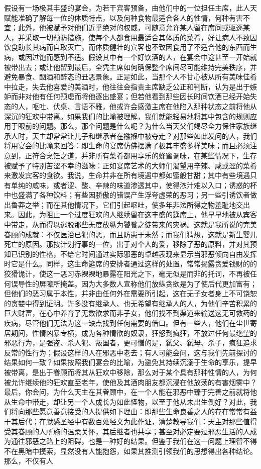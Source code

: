 假设有一场极其丰盛的宴会，为若干宾客预备，由他们中的一位担任主席，此人天赋能准确了解每一位的体质特点，以及何种食物最适合各人的性情，何种有害不宜；此外，他被赋予对他们近乎绝对的权威，可随意允许某人留在席间或驱逐某人，并采取一切预防措施，使每个人都食用最适合其体质的菜肴，好让病人不致因饮食助长其病而自取灭亡，而体质健壮的宾客也不致因食用了不适合他的东西而生病，或因过饱而感到不适。假设其中有一个好饮酒的人，在宴会中途甚至一开始就被带出去；或让他留到最后，全凭主席如何确保整个席间尽可能维持完美秩序，并避免暴食、酗酒和醉态的丑恶景象。正是如此，当那个人不甘心被从所有美味佳肴中拉走，失去他喜爱的美酒时，他往往会指责主席缺乏公正和判断，认为是出于嫉妒而非对他有任何预虑而将他逐出盛宴；但若他看到那些因长时间饮酒已经开始失态的人，呕吐、伏桌、言语不雅，他或许会感激主席在他陷入那种状态之前将他从深沉的狂欢中带离。如果我们的比喻被理解，我们就能轻易地将其中包含的规则应用于眼前的问题。那么，那个问题是什么呢？为什么当天父们竭尽全力保住家族继承人时，天主却常常让儿子和继承者在襁褓中被夺走？对那些如此发问的人，我们将用宴会的比喻来回答：即生命的宴席仿佛摆满了极其丰盛多样美味；而且必须注意到，正符合烹饪之道，并非所有菜肴都用享乐的蜂蜜调味，在某些情况下，生存被赋予了特别苦涩不幸的滋味：正如宴席艺术的大师们渴望用辛辣、咸或涩的菜肴来激发宾客的食欲。我说，生命并非在所有境遇中都如蜜般甘甜；其中有些境遇只有单纯的咸味，或者涩、酸、辛辣的味道渗透其中，使得浓汁难以入口；诱惑的杯中也盛满了各种饮料；有些因骄傲的错误产生浮夸虚荣的恶习；另一些引诱饮者做出鲁莽之举；而在其他情况下，它们引起呕吐，使多年非法所得之物羞耻地交出来。因此，为阻止一个过度狂欢的人继续留在这丰盛的筵席上，他早早地被从宾客中带走，从而得以逃脱那些无度放纵为饕餮之徒带来的灾祸。这就是我所说的完美眷顾的成就：不仅医治已犯的恶，而且防患于未然；而我们猜想，这就是新生婴儿死亡的原因。那按计划行事的一位，出于对个人的爱，移除了恶的原料，并对其预知已识别的性格，不给它时间通过实际邪恶的卓越表现来显示当邪恶倾向自由发挥时它是什么。同样，这生命筵席的安排者通过这样的处置，常常揭露贪爱钱财的的狡猾诡计，使这一恶习赤裸裸地暴露在阳光之下，毫无似是而非的托词，不再被任何误导性的屏障所掩盖。因为大多数人宣称他们放纵贪欲是为了使后代更加富有；但他们的恶习属于本性，并非由任何外在需要所引起，这在无子女者身上不可饶恕的贪婪中得到证明。许多没有继承人、也无希望有继承人的人，为他们辛苦积累的巨大财富，在心中养育了无数欲求而非子女，他们找不到渠道来输送这无可救药的疾病，尽管他们无法为这一缺点找到任何需要的借口。但有一些人，他们在尘世寄居期间，性情凶暴专横，成为各种情欲的奴隶，狂怒到疯狂，不放过任何最绝望的邪恶行为，是强盗、杀人犯、叛国者，更可憎的是，弑父、弑母、杀子，疯狂追求反常的性行为；假设这样的人在邪恶中老去；有人可能会问，这与我们先前探讨的结果如何一致？如果按照我们宴会的比喻，为避免其持续沉溺于生命的享乐，提早被带离，是出于眷顾而将其从狂欢中移除，那么对于某个具有那种性情的人，为何被允许继续他的狂欢直至老年，使他及其酒肉朋友都沉浸在他放荡的有害烟雾中？最后，你会问，为什么天主在其眷顾中，在一个人能在邪恶中臻于完善之前就将他从生命中带走，却让另一个人成长为如此怪物，以至于他从未出生倒好？对此，我们将向那些愿意善意接受的人提供如下理由：即那些生命良善之人的存在常常有益于其后代；在默感圣经中有数百处经文为此作证，清楚教导我们：天主对那些值得受其眷顾的人所施的温柔关怀，其后继者也共享；甚至对必定要过邪恶生活的人成为通往邪恶之路上的阻碍，也是一种好的结果。但鉴于我们在这一问题上理智不得不在黑暗中摸索，显然没有人能抱怨，如果其推测引领我们的思想得出各种结论。那么，不仅有人